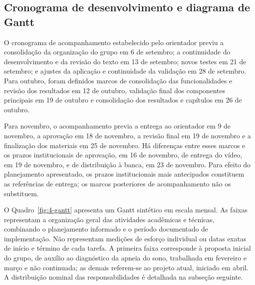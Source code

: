 \subsection{Cronograma de desenvolvimento e diagrama de Gantt}

O cronograma de acompanhamento estabelecido pelo orientador previu a consolidação da organização do grupo em 6 de setembro; a continuidade do desenvolvimento e da revisão do texto em 13 de setembro; novos testes em 21 de setembro; e ajustes da aplicação e continuidade da validação em 28 de setembro. Para outubro, foram definidos marcos de consolidação das funcionalidades e revisão dos resultados em 12 de outubro, validação final dos componentes principais em 19 de outubro e consolidação dos resultados e capítulos em 26 de outubro.

Para novembro, o acompanhamento previa a entrega ao orientador em 9 de novembro, a aprovação em 18 de novembro, a revisão final em 19 de novembro e a finalização dos materiais em 25 de novembro. Há diferenças entre esses marcos e os prazos institucionais de aprovação, em 16 de novembro, de entrega do vídeo, em 19 de novembro, e de distribuição à banca, em 23 de novembro. Para efeito do planejamento apresentado, os prazos institucionais mais antecipados constituem as referências de entrega; os marcos posteriores de acompanhamento não os substituem.

O Quadro~\ref{fig:4-gantt} apresenta um Gantt sintético em escala mensal. As faixas representam a organização geral das atividades acadêmicas e técnicas, combinando o planejamento informado e o período documentado de implementação. Não representam medições de esforço individual ou datas exatas de início e término de cada tarefa. A primeira faixa corresponde à proposta inicial do grupo, de auxílio ao diagnóstico da apneia do sono, trabalhada em fevereiro e março e não continuada; as demais referem-se ao projeto atual, iniciado em abril. A distribuição nominal das responsabilidades é detalhada na subseção seguinte.

